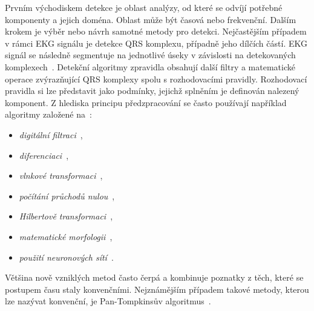 Prvním východiskem detekce je oblast analýzy, od které se odvíjí potřebné
komponenty a jejich doména. Oblast může být časová nebo frekvenční. Dalším
krokem je výběr nebo návrh samotné metody pro detekci. Nejčastějším případem v
rámci EKG signálu je detekce QRS komplexu, případně jeho dílčích částí. EKG
signál se následně segmentuje na jednotlivé úseky v závislosti na detekovaných
komplexech~\cite{Canento2012}. Detekční algoritmy zpravidla obsahují další
filtry a matematické operace zvýrazňující QRS komplexy spolu s rozhodovacími
pravidly. Rozhodovací pravidla si lze představit jako podmínky, jejichž splněním
je definován nalezený komponent. Z hlediska principu předzpracování se často
používají například algoritmy založené na~\cite{Kohler2002,Vaneghi2012}:
\begin{itemize}[noitemsep]
	\item \textit{digitální filtraci}~\cite{Sornmo1982,Kesel1997481},
	\item \textit{diferenciaci}~\cite{Tompkins1983,Hamilton1987},
	\item \textit{vlnkové transformaci}~\cite{Yao2020,Ndiaye2020},
	\item \textit{počítání průchodů nulou}~\cite{Kohler2003,Turnip2018},
	\item \textit{Hilbertově transformaci}~\cite{Valluraiah2015, Ouali2020},
	\item \textit{matematické morfologii}~\cite{Li1999,Tadejko2007},
	\item \textit{použití neuronových sítí}~\cite{Kiranyaz2016,Zhai2018}.
\end{itemize}

Většina nově vzniklých metod často čerpá a kombinuje poznatky z těch, které se
postupem času staly konvenčními. Nejznámějším případem takové metody, kterou lze
nazývat konvenční, je Pan-Tompkinsův algoritmus~\cite{Pan1985}.

